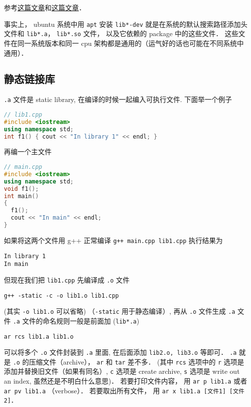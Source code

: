 
\begin{issues}
\issueDraft
\end{issues}


参考\href{https://blog.feabhas.com/2014/04/static-and-dynamic-libraries-on-linux/}{这篇文章}和\href{https://gcc.gnu.org/onlinedocs/gcc/Link-Options.html}{这篇文章}．

事实上， ubuntu 系统中用 \verb|apt| 安装 \verb|lib*-dev| 就是在系统的默认搜索路径添加头文件和 \verb|lib*.a|， \verb|lib*.so| 文件， 以及它依赖的 package 中的这些文件． 这些文件在同一系统版本和同一 cpu 架构都是通用的（运气好的话也可能在不同系统中通用）．

\subsection{静态链接库}

\verb|.a| 文件是 static library, 在编译的时候一起编入可执行文件. 下面举一个例子

\begin{lstlisting}[language=cpp]
// lib1.cpp
#include <iostream>
using namespace std;
int f1() { cout << "In library 1" << endl; }
\end{lstlisting}

再编一个主文件

\begin{lstlisting}[language=cpp]
// main.cpp
#include <iostream>
using namespace std;
void f1();
int main()
{
  f1();
  cout << "In main" << endl;
}
\end{lstlisting}

如果将这两个文件用 g++ 正常编译 \verb`g++ main.cpp lib1.cpp` 执行结果为
\begin{lstlisting}[language=none]
In library 1
In main
\end{lstlisting}
但现在我们把 \verb|lib1.cpp| 先编译成 \verb|.o| 文件

\begin{lstlisting}[language=none]
g++ -static -c -o lib1.o lib1.cpp
\end{lstlisting}

(其实 \verb`-o lib1.o` 可以省略) （\verb`-static` 用于静态编译）, 再从 \verb|.o| 文件生成 \verb|.a| 文件 \verb|.a| 文件的命名规则一般是前面加 (\verb`lib*.a`)

\begin{lstlisting}[language=none]
ar rcs lib1.a lib1.o
\end{lstlisting}
可以将多个 \verb|.o| 文件封装到 \verb|.a| 里面, 在后面添加 \verb|lib2.o, lib3.o| 等即可． \verb`.a` 就是 \verb`.o` 的压缩文件（archive）， \verb`ar` 和 \verb`tar` 差不多． (其中 \verb|rcs| 选项中的 \verb`r` 选项是添加并替换旧文件（如果有同名）, \verb`c` 选项是 create archive, \verb`s` 选项是 write out an index, 虽然还是不明白什么意思)． 若要打印文件内容， 用 \verb|ar p lib1.a| 或者 \verb|ar pv lib1.a| （verbose）． 若要取出所有文件， 用 \verb|ar x lib1.a [文件1] [文件2]|．

